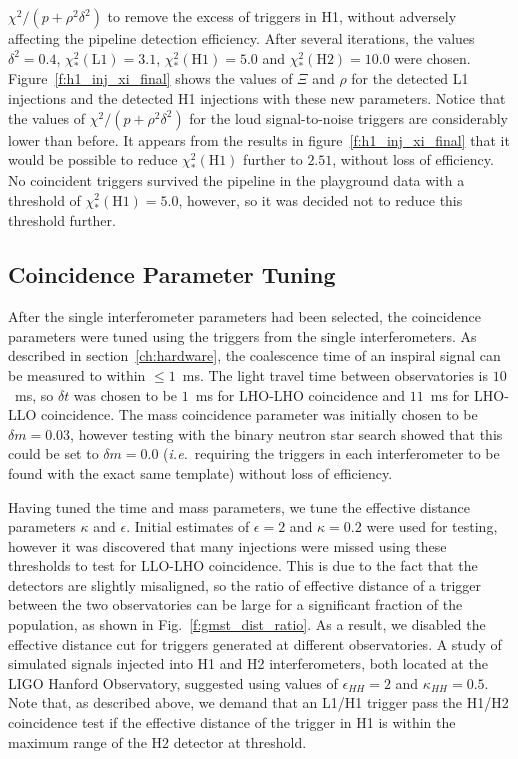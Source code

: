 $\chi^2/(p+\rho^2\delta^2)$ to remove the excess of triggers in H1, without
adversely affecting the pipeline detection efficiency. After several
iterations, the values $\delta^2 = 0.4$, $\chi^2_\ast(\mathrm{L1}) = 3.1$,
$\chi^2_\ast(\mathrm{H1}) = 5.0$ and $\chi^2_\ast(\mathrm{H2}) = 10.0$ were
chosen.  Figure~\ref{f:h1_inj_xi_final} shows the values of $\Xi$ and $\rho$
for the detected L1 injections and the detected H1 injections with these new
parameters. Notice that the values of $\chi^2/(p+\rho^2\delta^2)$ for the loud
signal-to-noise triggers are considerably lower than before. It appears from
the results in figure~\ref{f:h1_inj_xi_final} that it would be possible to
reduce $\chi^2_\ast(\mathrm{H1})$ further to $2.51$, without loss of
efficiency. No coincident triggers survived the pipeline in the playground
data with a threshold of $\chi^2_\ast(\mathrm{H1}) = 5.0$, however, so it was
decided not to reduce this threshold further.

\subsection{Coincidence Parameter Tuning}
\label{ss:coinc_tuning}

After the single interferometer parameters had been selected, the coincidence
parameters were tuned using the triggers from the single interferometers.  As
described in section~\ref{ch:hardware}, the coalescence time of an inspiral
signal can be measured to within $\le1$~ms. The light travel time between
observatories is $10$~ms, so $\delta t$ was chosen to be $1$~ms for LHO-LHO
coincidence and $11$~ms for LHO-LLO coincidence. The mass coincidence
parameter was initially chosen to be $\delta m = 0.03$, however testing with
the binary neutron star search showed that this could be set to $\delta m =
0.0$ ({\it i.e.}\ requiring the triggers in each interferometer to be found
with the exact same template) without loss of efficiency.

Having tuned the time and mass parameters, we tune the effective
distance parameters $\kappa$ and $\epsilon$. Initial estimates of $\epsilon =
2$ and $\kappa = 0.2$ were used for testing, however it was discovered that
many injections were missed using these thresholds to test for LLO-LHO
coincidence. This is due to the fact that the detectors are slightly
misaligned, so the ratio of effective distance of a trigger between the two
observatories can be large for a significant fraction of the population, as
shown in Fig.~\ref{f:gmst_dist_ratio}. As a result, we disabled the
effective distance cut for triggers generated at different observatories.
A study of simulated signals injected into H1 and H2 interferometers, both
located at the LIGO Hanford Observatory, suggested using values
of $\epsilon_{HH} = 2$ and $\kappa_{HH} = 0.5$. Note
that, as described above, we demand that an L1/H1 trigger pass the H1/H2
coincidence test if the effective distance of the trigger in H1 is within the
maximum range of the H2 detector at threshold.

